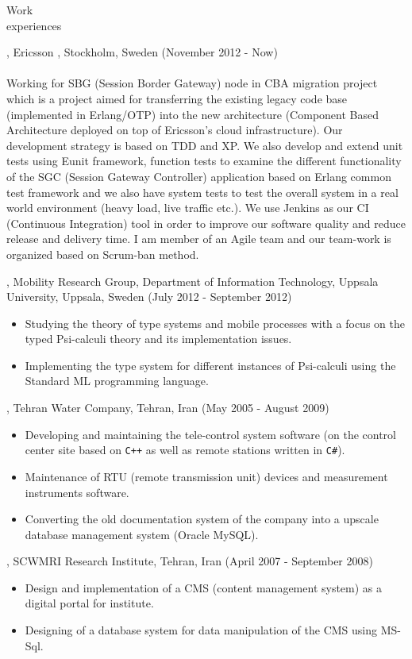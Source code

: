 \documentclass{resume}
\begin{document}
\begin{category}{Work \\experiences}

, Ericsson , Stockholm, Sweden (November 2012 - Now)\\ \\
Working for SBG (Session Border Gateway) node in CBA migration project which is a project 
aimed for transferring the existing legacy code base (implemented in Erlang/OTP) into the 
new architecture (Component Based Architecture deployed on top of Ericsson's cloud infrastructure). 
Our development strategy is based on TDD and XP. We also develop and extend unit tests using Eunit framework, 
function tests to examine the different functionality of the SGC (Session Gateway Controller) application 
based on Erlang common test framework and we also have system tests to test the overall system in a real 
world environment (heavy load, live traffic etc.). 
We use Jenkins as our CI (Continuous Integration) tool in order to improve our software 
quality and reduce release and delivery time. I am member of an Agile team and our team-work is 
organized based on Scrum-ban method.

, Mobility Research Group, Department of Information Technology, 
Uppsala University, Uppsala, Sweden (July 2012 - September 2012)\\ 
\begin{itemize}
 \item Studying the theory of type systems and mobile processes with a 
  focus on the typed Psi-calculi theory and its implementation issues.
 \item Implementing the type system for different instances of Psi-calculi 
  using the Standard ML programming language.
\end{itemize}

, Tehran Water Company, Tehran, Iran (May 2005 - August 2009)\\ 
\begin{itemize}
 \item Developing and maintaining the tele-control system software (on the control center site based 
  on \texttt{C++} as well as remote stations written in \texttt{C\#}).
 \item Maintenance of RTU (remote transmission unit) devices and measurement instruments software.
 \item Converting the old documentation system of the company into a upscale 
  database management system (Oracle MySQL).
\end{itemize}

, SCWMRI Research Institute, 
Tehran, Iran (April 2007 - September 2008)
\begin{itemize} 
\item Design and implementation of a CMS (content management system) as a 
 digital portal for institute.
\item Designing of a database system for data manipulation of the CMS using MS-Sql.
\end{itemize}

\end{category}
\end{document}
